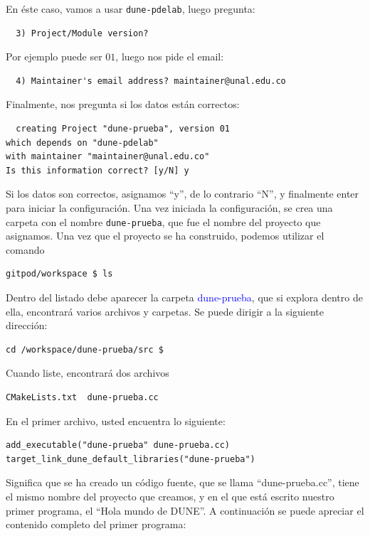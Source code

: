 En éste caso, vamos a usar \verb|dune-pdelab|, luego pregunta:

\begin{verbatim}
  3) Project/Module version? 
\end{verbatim}

Por ejemplo puede ser $01$, luego nos pide el email:

\begin{verbatim}
  4) Maintainer's email address? maintainer@unal.edu.co 
\end{verbatim}

Finalmente, nos pregunta si los datos están correctos:

\begin{verbatim}
  creating Project "dune-prueba", version 01 
which depends on "dune-pdelab"
with maintainer "maintainer@unal.edu.co"
Is this information correct? [y/N] y
\end{verbatim}

Si los datos son correctos, asignamos ``y'', de lo contrario ``N'', y
finalmente enter para iniciar la configuración.
Una vez iniciada la configuración, se crea una carpeta con el nombre
\verb|dune-prueba|, que fue el nombre del proyecto que asignamos.
Una vez que el proyecto se ha construido, podemos utilizar el comando
\begin{verbatim}
gitpod/workspace $ ls
\end{verbatim}

Dentro del listado debe aparecer la carpeta
\textcolor{blue}{dune-prueba}, que si explora dentro de ella,
encontrará varios archivos y carpetas.
Se puede dirigir a la siguiente dirección:
\begin{verbatim}
cd /workspace/dune-prueba/src $ 
\end{verbatim}
Cuando liste, encontrará dos archivos

\begin{verbatim}
CMakeLists.txt  dune-prueba.cc
\end{verbatim}

En el primer archivo, usted encuentra lo siguiente:

\begin{verbatim}
add_executable("dune-prueba" dune-prueba.cc)
target_link_dune_default_libraries("dune-prueba")
\end{verbatim}

Significa que se ha creado un código fuente, que se llama
``dune-prueba.cc'', tiene el mismo nombre del proyecto que creamos, y
en el que está escrito nuestro primer programa, el ``Hola mundo de DUNE''.
A continuación se puede apreciar el contenido completo del primer programa:

\begin{listing}
	\inputminted{cpp}{../../src/dune-learn.cc}
\end{listing}

\immediate{}